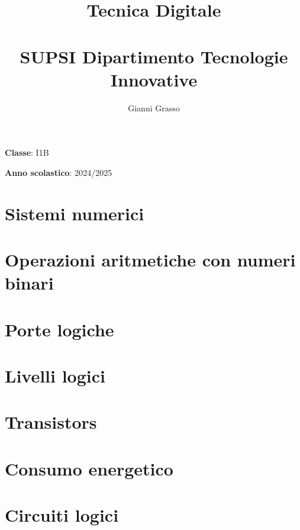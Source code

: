\documentclass{article}
\title{
    Tecnica Digitale \\
    \phantom{}\\
    \large SUPSI Dipartimento Tecnologie Innovative
}
\author{Gianni Grasso}
\begin{document}
\maketitle
\hphantom{ }
\vspace{14.5cm}

\textbf{Classe}: I1B

\textbf{Anno scolastico}: 2024/2025
\pagebreak


\tableofcontents
\pagebreak

\section{Sistemi numerici}

\pagebreak

\section{Operazioni aritmetiche con numeri binari}

\pagebreak

\section{Porte logiche}

\pagebreak

\section{Livelli logici}

\pagebreak

\section{Transistors}

\pagebreak

\section{Consumo energetico}

\pagebreak

\section{Circuiti logici}

\pagebreak
\end{document}
